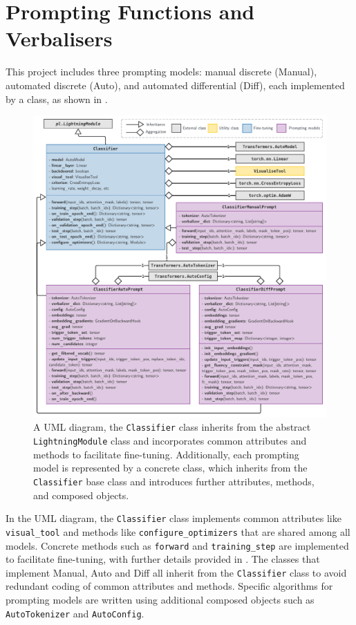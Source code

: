 \section{Prompting Functions and Verbalisers} \label{sec:prompting-models}
\vspace{-0.5em}
This project includes three prompting models: manual discrete (Manual), automated discrete (Auto), and automated differential (Diff), each implemented by a class, as shown in .
\vspace{-1em}
\begin{figure}[!ht]
    \centering
    \includegraphics[width=\hsize]{figures/implementation_media/impl-uml.pdf}
    \caption{A UML diagram, the \texttt{Classifier} class inherits from the abstract \texttt{LightningModule} class and incorporates common attributes and methods to facilitate fine-tuning. Additionally, each prompting model is represented by a concrete class, which inherits from the \texttt{Classifier} base class and introduces further attributes, methods, and composed objects.}
    \label{fig:impl-uml}
\end{figure}

In the UML diagram, the \texttt{Classifier} class implements common attributes like \texttt{visual\_tool} and methods like \texttt{configure\_optimizers} that are shared among all models. Concrete methods such as \texttt{forward} and \texttt{training\_step} are implemented to facilitate fine-tuning, with further details provided in . The classes that implement Manual, Auto and Diff all inherit from the \texttt{Classifier} class to avoid redundant coding of common attributes and methods. Specific algorithms for prompting models are written using additional composed objects such as \texttt{AutoTokenizer} and \texttt{AutoConfig}.

